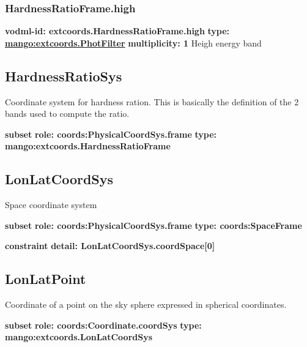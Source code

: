     \subsubsection{HardnessRatioFrame.high}
      \textbf{vodml-id: extcoords.HardnessRatioFrame.high} \newline
      \textbf{type: \hyperref[sect:extcoords.PhotFilter]{mango:extcoords.PhotFilter}} \newline
      \textbf{multiplicity: 1} \newline 
      Heigh energy band

  \subsection{HardnessRatioSys}
  \label{sect:extcoords.HardnessRatioSys}
    Coordinate system for hardness ration. This is basically the definition of the 2 bands used to compute the ratio.

    \noindent \textbf{subset} \newline
    \indent   \textbf{role: coords:PhysicalCoordSys.frame} \newline
    \indent   \textbf{type:  mango:extcoords.HardnessRatioFrame} \newline


  \subsection{LonLatCoordSys}
  \label{sect:extcoords.LonLatCoordSys}
    Space coordinate system

    \noindent \textbf{subset} \newline
    \indent   \textbf{role: coords:PhysicalCoordSys.frame} \newline
    \indent   \textbf{type: coords:SpaceFrame} \newline


    \noindent \textbf{constraint} \newline
    \indent    \textbf{detail: LonLatCoordSys.coordSpace[0] }\newline


  \subsection{LonLatPoint}
  \label{sect:extcoords.LonLatPoint}
    Coordinate of a point on the sky sphere expressed in spherical coordinates.

    \noindent \textbf{subset} \newline
    \indent   \textbf{role: coords:Coordinate.coordSys} \newline
    \indent   \textbf{type:  mango:extcoords.LonLatCoordSys} \newline


